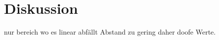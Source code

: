 \section{Diskussion}
\label{sec:Diskussion}
nur bereich wo es linear abfällt 
Abstand zu gering daher doofe Werte.